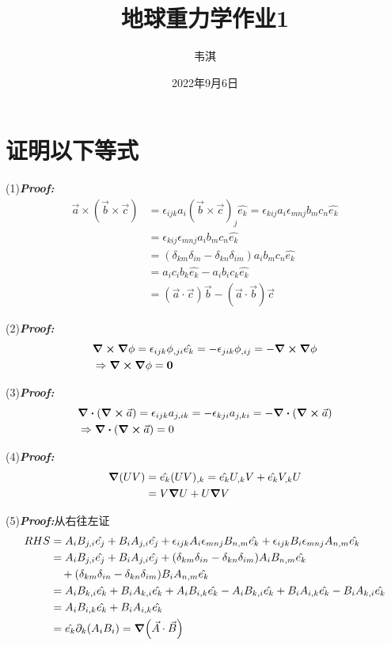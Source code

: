 \documentclass{article}
\title{地球重力学作业1}
\author{韦淇 \quad 2000012440}
\date{2022年9月6日}
\begin{document}
\maketitle

\section{证明以下等式}
(1)\textbf{\it Proof:}
\begin{align*}
\vec{a}\times(\vec{b}\times\vec{c}) & =  \epsilon_{ijk}a_i(\vec{b}\times\vec{c})_j\hat{e_k} = \epsilon_{kij}a_i\epsilon_{mnj}b_m c_n \hat{e_k}\\
& = \epsilon_{kij}\epsilon_{mnj}a_i b_m c_n \hat{e_k}\\
& = (\delta_{km}\delta_{in} - \delta_{kn}\delta_{im}) a_i b_m c_n \hat{e_k}\\
& = a_i c_i b_k \hat{e_k} - a_i b_i c_k \hat{e_k}\\
& = (\vec{a}\cdot \vec{c})\vec{b} - (\vec{a}\cdot \vec{b})\vec{c}
\end{align*}

(2)\textbf{\it Proof:}
\begin{align*}
    &\curl \grad \phi = \epsilon_{ijk} \phi_{,ji} \hat{e_k} = -\epsilon_{jik} \phi_{,ij} = - \curl \grad \phi \\
    &\Rightarrow \curl \grad \phi = \mathbf{0}
\end{align*}

(3)\textbf{\it Proof:}
\begin{align*}
    &\div (\curl \vec{a}) = \epsilon_{ijk} a_{j,ik} = -\epsilon_{kji} a_{j,ki} = -  \div (\curl \vec{a}) \\
    &\Rightarrow \div (\curl \vec{a}) = 0
\end{align*}

(4)\textbf{\it Proof:}
\begin{align*}
    \grad(UV) &= \hat{e_k}(UV)_{,k} = \hat{e_k}U_{,k}V + \hat{e_k}V_{,k}U \\
    &= V \grad U + U \grad V
\end{align*}

(5)\textbf{\it Proof:}从右往左证
\begin{align*}
    RHS & =  A_i B_{j,i} \hat{e_j} + B_i A_{j,i} \hat{e_j} + \epsilon_{ijk} A_i \epsilon_{mnj} B_{n,m} \hat{e_k} + \epsilon_{ijk} B_i \epsilon_{mnj} A_{n,m} \hat{e_k} \\
    & = A_i B_{j,i} \hat{e_j} + B_i A_{j,i} \hat{e_j} + (\delta_{km}\delta_{in} - \delta_{kn}\delta_{im})A_i B_{n,m} \hat{e_k} \\
    & \quad + (\delta_{km}\delta_{in} - \delta_{kn}\delta_{im})B_i A_{n,m} \hat{e_k}\\
    & = A_i B_{k,i} \hat{e_k} + B_i A_{k,i} \hat{e_k} + A_i B_{i,k} \hat{e_k} - A_i B_{k,i} \hat{e_k} + B_i A_{i,k} \hat{e_k} - B_i A_{k,i} \hat{e_k}\\
    & = A_i B_{i,k} \hat{e_k} + B_i A_{i,k} \hat{e_k} \\
    & = \hat{e_k} \partial_k (A_i B_i) = \grad (\vec{A}\cdot \vec{B})
\end{align*}
\end{document}
